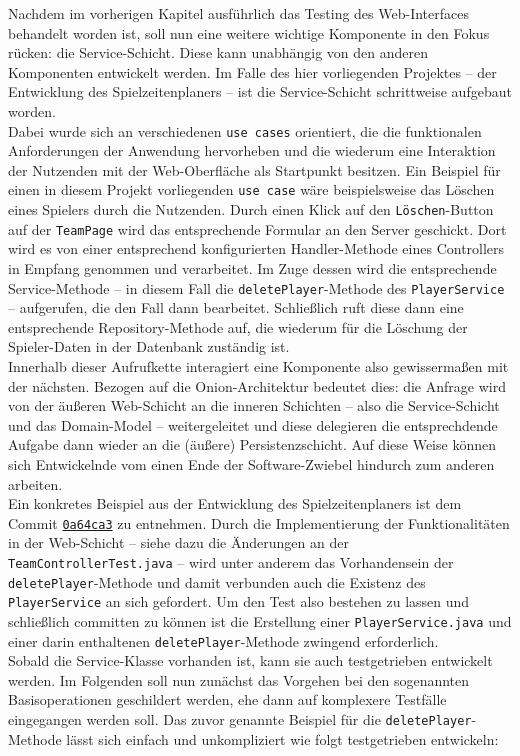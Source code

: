 
Nachdem im vorherigen Kapitel ausführlich das Testing des Web-Interfaces behandelt 
worden ist, soll nun eine weitere wichtige Komponente in den Fokus rücken: die 
Service-Schicht. Diese kann unabhängig von den anderen Komponenten entwickelt 
werden. Im Falle des hier vorliegenden Projektes -- der Entwicklung des 
Spielzeitenplaners -- ist die Service-Schicht schrittweise aufgebaut worden. \\ 
Dabei wurde sich an verschiedenen \texttt{use cases} orientiert, die die 
funktionalen Anforderungen der Anwendung hervorheben und die wiederum eine 
Interaktion der Nutzenden mit der Web-Oberfläche als Startpunkt besitzen. Ein 
Beispiel für einen in diesem Projekt vorliegenden \texttt{use case} wäre 
beispielsweise das Löschen eines Spielers durch die Nutzenden. Durch einen Klick 
auf den \texttt{Löschen}-Button auf der \texttt{TeamPage} wird das entsprechende 
Formular an den Server geschickt. Dort wird es von einer entsprechend 
konfigurierten Handler-Methode eines Controllers in Empfang genommen und 
verarbeitet. Im Zuge dessen wird die entsprechende Service-Methode -- in diesem 
Fall die \texttt{deletePlayer}-Methode des \texttt{PlayerService} -- aufgerufen, 
die den Fall dann bearbeitet. Schließlich ruft diese dann eine entsprechende 
Repository-Methode auf, die wiederum für die Löschung der Spieler-Daten in der 
Datenbank zuständig ist. \\ 
Innerhalb dieser Aufrufkette interagiert eine Komponente also gewissermaßen mit der 
nächsten. Bezogen auf die Onion-Architektur bedeutet dies: die Anfrage wird von der 
äußeren Web-Schicht an die inneren Schichten -- also die Service-Schicht und das 
Domain-Model -- weitergeleitet und diese delegieren die entsprechdende Aufgabe dann wieder an die (äußere) Persistenzschicht. Auf diese Weise können sich Entwickelnde vom 
einen Ende der Software-Zwiebel hindurch zum anderen arbeiten. \\ 
Ein konkretes Beispiel aus der Entwicklung des Spielzeitenplaners ist dem Commit 
\href{https://github.com/FlorianOhmes/bat_spielzeitenplaner/commit/0a64ca3359402c06358b43cc41236ca24c2ec9cd#diff-c21f1f59588419db3d2efda09d4e20682f83653b4ef81ca9847d7458bc5b2f5f}{\texttt{0a64ca3}}
zu entnehmen. Durch die Implementierung der Funktionalitäten in der Web-Schicht -- 
siehe dazu die Änderungen an der \texttt{TeamControllerTest.java} -- wird unter 
anderem das Vorhandensein der \texttt{deletePlayer}-Methode und damit verbunden auch 
die Existenz des \texttt{PlayerService} an sich gefordert. Um den Test also bestehen 
zu lassen und schließlich committen zu können ist die Erstellung einer 
\texttt{PlayerService.java} und einer darin enthaltenen \texttt{deletePlayer}-Methode 
zwingend erforderlich. \\ 
Sobald die Service-Klasse vorhanden ist, kann sie auch testgetrieben entwickelt 
werden. Im Folgenden soll nun zunächst das Vorgehen bei den sogenannten 
Basisoperationen geschildert werden, ehe dann auf komplexere Testfälle eingegangen 
werden soll. Das zuvor genannte Beispiel für die \texttt{deletePlayer}-Methode lässt 
sich einfach und unkompliziert wie folgt testgetrieben entwickeln: 


